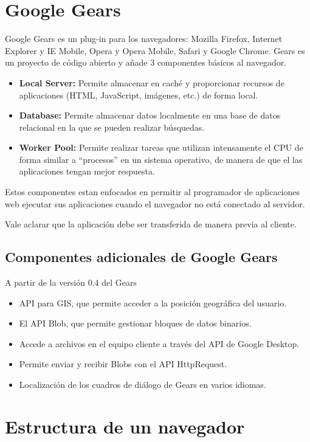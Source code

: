 \documentclass[a4paper]{report}
\begin{document}
\section{Google Gears}
Google Gears es un plug-in para los navegadores: Mozilla Firefox, Internet
Explorer y IE Mobile, Opera y Opera Mobile, Safari y Google Chrome. Gears es
un proyecto de código abierto y añade 3 componentes básicos al navegador.
\begin{itemize}
  \item {\textbf{Local Server:} Permite almacenar en caché y proporcionar
  recursos de aplicaciones (HTML, JavaScript, imágenes, etc.) de forma local. }
  \item {\textbf{Database:} Permite almacenar datos localmente en una base
  de datos relacional en la que se pueden realizar búsquedas. }
  \item { \textbf{Worker Pool:} Permite realizar tareas que utilizan
  intensamente el CPU de forma similar a ``procesos'' en un sistema operativo,
de manera de que el 
  las aplicaciones tengan mejor respuesta.}
\end{itemize}
Estos componentes estan enfocados en permitir al programador de aplicaciones web
ejecutar sus aplicaciones cuando el navegador no está conectado al servidor.

Vale aclarar que la aplicación debe ser transferida de manera previa al cliente.

\subsection{Componentes adicionales de Google Gears}
A partir de la versión 0.4 del Gears
\begin{itemize}
  \item{API para GIS, que permite acceder a la posición geográfica del usuario.}
  \item {El API Blob, que permite gestionar bloques de datos binarios.}
  \item {Accede a archivos en el equipo cliente a través del API de Google
  Desktop.}
  \item {Permite enviar y recibir Blobs con el API HttpRequest.}
  \item {Localización de los cuadros de diálogo de Gears en varios idiomas.}  
\end{itemize}



\section{Estructura de un navegador}
\end{document}
